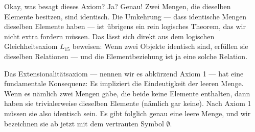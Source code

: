 \begin{math-stroke}
\begin{axiom}[Extensionalitätsaxiom]\label[axiom]{ax:extensionalitaet}
\[ \forall x \forall y \, \bigl( \forall z \, (z \in x \leftrightarrow z \in y) \rightarrow x = y \bigr) \]
\end{axiom}
\end{math-stroke}

\begin{ai-global-state-checkpoint-invisible-content}
\end{ai-global-state-checkpoint-invisible-content}

\begin{spoken-clean}[01:22:20 - 01:24:10]
Okay, was besagt dieses Axiom? Ja?
Genau! Zwei Mengen, die dieselben Elemente besitzen, sind identisch. Die Umkehrung --- dass identische Mengen dieselben Elemente haben --- ist übrigens ein rein logisches Theorem, das wir nicht extra fordern müssen. Das lässt sich direkt aus dem logischen Gleichheitsaxiom $L_{15}$ beweisen: Wenn zwei Objekte identisch sind, erfüllen sie dieselben Relationen --- und die Elementbeziehung ist ja eine solche Relation.

Das Extensionalitätsaxiom --- nennen wir es abkürzend Axiom 1 --- hat eine fundamentale Konsequenz: Es impliziert die Eindeutigkeit der leeren Menge. Wenn es nämlich zwei Mengen gäbe, die beide keine Elemente enthalten, dann haben sie trivialerweise dieselben Elemente (nämlich gar keine). Nach Axiom 1 müssen sie also identisch sein. Es gibt folglich genau eine leere Menge, und wir bezeichnen sie ab jetzt mit dem vertrauten Symbol $\emptyset$.
\end{spoken-clean}

